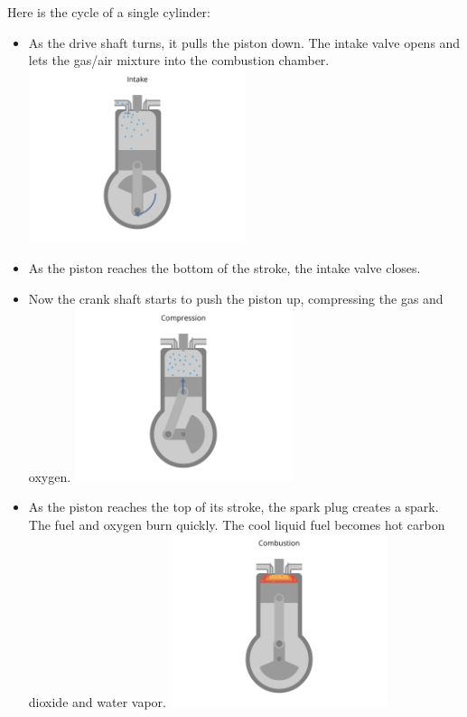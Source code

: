Here is the cycle of a single cylinder:
\begin{itemize}

\item As the drive shaft turns,  it pulls the piston down.  The intake valve opens and lets the gas/air mixture into the combustion chamber.
\includegraphics[width=0.5\textwidth]{engine-09.png}

\item As the piston reaches the bottom of the stroke,  the intake valve closes.
\item Now the crank shaft starts to push the piston up, compressing the gas and oxygen.
\includegraphics[width=0.5\textwidth]{engine-10.png}

\item As the piston reaches the top of its stroke,  the spark plug creates a spark.  The fuel and oxygen burn quickly.  The cool liquid fuel becomes hot carbon dioxide and water vapor.
\includegraphics[width=0.5\textwidth]{engine-11.png}


\end{itemize}
